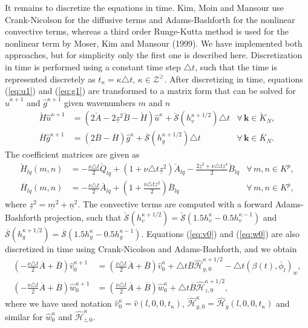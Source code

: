 \documentclass[preprint]{elsarticle}
\newcommand{\N}[1]{\check{#1}}
\newcommand{\D}[1]{\overline{#1}}
\begin{document}
It remains to discretize the equations in time. Kim, Moin and Mansour use 
Crank-Nicolson for the diffusive terms and Adams-Bashforth for the nonlinear 
convective terms, whereas a third order Runge-Kutta method is used for the 
nonlinear term by Moser, Kim and Mansour (1999). We have implemented both 
approaches, but for simplicity only the first one is described here. 
Discretization in time is performed using a constant time step $\triangle t$, 
such that the time is represented discretely as $t_{\kappa} = {\kappa} \triangle t, \, {\kappa} \in 
\mathcal{Z}^{\ge}$. After 
discretizing in time, equations (\ref{eq:u1}) and (\ref{eq:g1}) are transformed 
to a matrix form that can be solved for $\hat{u}^{{\kappa}+1}$ and $\hat{g}^{{\kappa}+1}$ 
given wavenumbers $m$ and $n$
\begin{align}
\N{H}\hat{u}^{{\kappa}+1} & = \left(2\N{A} - 2\underline{z}^2\N{B} - \N{H} 
\right)\hat{u}^{{\kappa}} + \N{\mathcal{S}}(h_v^{{\kappa}+1/2}) \triangle t & 
\forall \, {\bm{k}} \in \N{K}_N, 
\label{eq:ufin}\\ 
\D{H} \hat{g}^{{\kappa}+1} &= \left(2 \D{B}-\D{H}\right) 
\hat{g}^{{\kappa}} + \D{\mathcal{S}}(h_g^{{\kappa}+1/2}) \triangle t &\forall \, 
{\bm{k}} \in 
\D{K}_N. \label{eq:gfin}
\end{align}
The coefficient matrices are given as
\begin{align}
\N{H}_{lq}(m, n) &= -\frac{\nu \triangle t}{2}\N{Q}_{lq} + \left( 1 + \nu 
\triangle t 
\underline{z}^2 \right) \N{A}_{lq} - \frac{2\underline{z}^2 + \nu \triangle t 
\underline{z}^4}{2} \N{B}_{lq} &\forall \, m, n \in K^p, 
\label{eq:Biharmonic_matrix} \\
\D{H}_{lq}(m, n) &= -\frac{\nu \triangle 
t}{2}\D{A}_{lq} + (1 + \frac{\nu \triangle t \underline{z}^2}{2}) \D{B}_{lq} 
&\forall \, m, n \in K^p, \label{eq:Helmholtz_matrix}
\end{align}
where $\underline{z}^2 = \underline{m}^2 + \underline{n}^2$. The convective 
terms are computed with a forward Adams-Bashforth projection, such that 
$\N{\mathcal{S}}(h_v^{{\kappa}+1/2}) = 
\N{\mathcal{S}}(1.5h_v^{{\kappa}} - 0.5 h_v^{{\kappa}-1})$ and $\D{\mathcal{S}}(h_g^{{\kappa}+1/2}) 
= \D{\mathcal{S}}(1.5h_g^{{\kappa}} - 0.5 h_g^{{\kappa}-1})$. Equations 
(\ref{eq:v0}) and (\ref{eq:w0}) are also discretized in time using 
Crank-Nicolson and Adams-Bashforth, and we obtain
\begin{align}
\left(-\frac{\nu \triangle t}{2}\D{A} + \D{B} \right)\hat{v}_0^{{\kappa}+1} &= 
\left(\frac{\nu \triangle t}{2}\D{A} + \D{B} 
\right)\hat{v}^{{\kappa}}_0 + \triangle t\D{B}\hat{\mathcal{H}}_{y,0}^{{\kappa}+1/2} - \triangle t \left(\beta(t), \D{\phi}_l \right)_w , 
\label{eq:v00} \\
\left(-\frac{\nu \triangle t}{2}\D{A} + \D{B} \right)\hat{w}_0^{{\kappa}+1} &= 
\left(\frac{\nu \triangle t}{2}\D{A} + \D{B} 
\right)\hat{w}^{{\kappa}}_0 + \triangle t\D{B}\hat{\mathcal{H}}_{z,0}^{{\kappa}+1/2}, 
\label{eq:w00}
\end{align}
where we have used notation $\hat{v}^{{\kappa}}_0 = \hat{v}(l, 0, 0, t_{\kappa})$, 
$\hat{\mathcal{H}}^{{\kappa}}_{y,0} = \hat{\mathcal{H}}_y(l, 0, 0, t_{\kappa})$ and similar 
for $\hat{w}^{\kappa}_0$ and $\hat{\mathcal{H}}^{\kappa}_{z,0}$.
\end{document}
